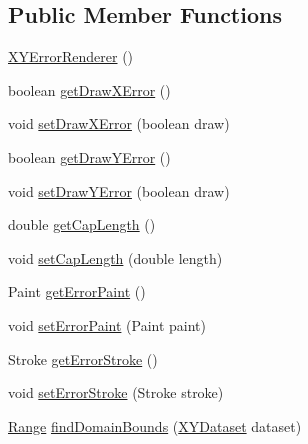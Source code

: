 \subsection*{Public Member Functions}
\begin{DoxyCompactItemize}
\item 
\mbox{\hyperlink{classorg_1_1jfree_1_1chart_1_1renderer_1_1xy_1_1_x_y_error_renderer_af4db8befa91d7ffdaffa9864451023a7}{X\+Y\+Error\+Renderer}} ()
\item 
boolean \mbox{\hyperlink{classorg_1_1jfree_1_1chart_1_1renderer_1_1xy_1_1_x_y_error_renderer_ab1a5ab1db9b1a1c185c3258a3abf6d84}{get\+Draw\+X\+Error}} ()
\item 
void \mbox{\hyperlink{classorg_1_1jfree_1_1chart_1_1renderer_1_1xy_1_1_x_y_error_renderer_a77815f8cffa301cab035dfb21d5d3481}{set\+Draw\+X\+Error}} (boolean draw)
\item 
boolean \mbox{\hyperlink{classorg_1_1jfree_1_1chart_1_1renderer_1_1xy_1_1_x_y_error_renderer_a5c8f1a7133334d269616167fa9600e99}{get\+Draw\+Y\+Error}} ()
\item 
void \mbox{\hyperlink{classorg_1_1jfree_1_1chart_1_1renderer_1_1xy_1_1_x_y_error_renderer_a46148e12e76dcd87d154d10127632570}{set\+Draw\+Y\+Error}} (boolean draw)
\item 
double \mbox{\hyperlink{classorg_1_1jfree_1_1chart_1_1renderer_1_1xy_1_1_x_y_error_renderer_ad72439c734df92e2dd89e4fa6dc5f071}{get\+Cap\+Length}} ()
\item 
void \mbox{\hyperlink{classorg_1_1jfree_1_1chart_1_1renderer_1_1xy_1_1_x_y_error_renderer_a78522ec7f32d90e558624ff4dab196cb}{set\+Cap\+Length}} (double length)
\item 
Paint \mbox{\hyperlink{classorg_1_1jfree_1_1chart_1_1renderer_1_1xy_1_1_x_y_error_renderer_aa366f33967304e07b792820fef8b3333}{get\+Error\+Paint}} ()
\item 
void \mbox{\hyperlink{classorg_1_1jfree_1_1chart_1_1renderer_1_1xy_1_1_x_y_error_renderer_a561701d3462cbba2ef397c7d8248b4c5}{set\+Error\+Paint}} (Paint paint)
\item 
Stroke \mbox{\hyperlink{classorg_1_1jfree_1_1chart_1_1renderer_1_1xy_1_1_x_y_error_renderer_a217ac2f91bafbe4f294e017c678be249}{get\+Error\+Stroke}} ()
\item 
void \mbox{\hyperlink{classorg_1_1jfree_1_1chart_1_1renderer_1_1xy_1_1_x_y_error_renderer_a29583e5b484669781822928997ccced5}{set\+Error\+Stroke}} (Stroke stroke)
\item 
\mbox{\hyperlink{classorg_1_1jfree_1_1data_1_1_range}{Range}} \mbox{\hyperlink{classorg_1_1jfree_1_1chart_1_1renderer_1_1xy_1_1_x_y_error_renderer_a9776b39a3a9dc9ede952ec6044e7975f}{find\+Domain\+Bounds}} (\mbox{\hyperlink{interfaceorg_1_1jfree_1_1data_1_1xy_1_1_x_y_dataset}{X\+Y\+Dataset}} dataset)

\end{DoxyCompactItemize}
